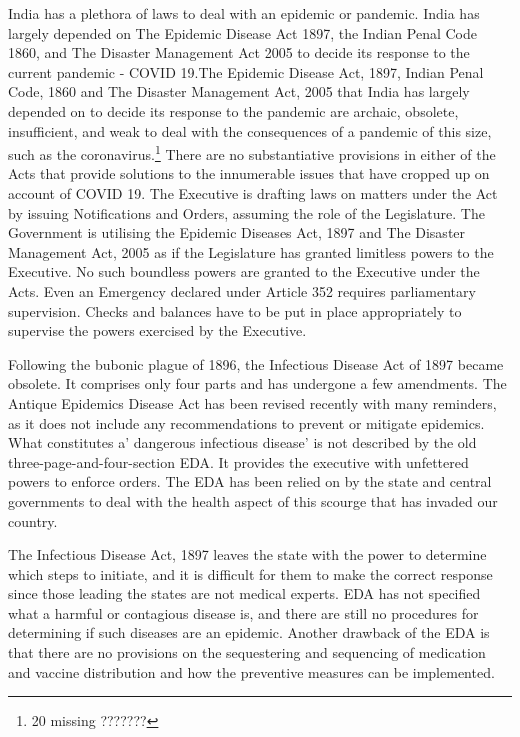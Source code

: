 \begin{multicols}{2}

\noi
India has a plethora of laws to deal with an epidemic or pandemic. India has largely depended
on The Epidemic Disease Act 1897, the Indian Penal Code 1860, and The Disaster
Management Act 2005 to decide its response to the current pandemic - COVID 19.The
Epidemic Disease Act, 1897, Indian Penal Code, 1860 and The Disaster Management Act,
2005 that India has largely depended on to decide its response to the pandemic are archaic,
obsolete, insufficient, and weak to deal with the consequences of a pandemic of this size, 
such as the coronavirus.\footnote{20 missing ???????} There are no substantiative provisions in either of the Acts that
provide solutions to the innumerable issues that have cropped up on account of COVID 19.
The Executive is drafting laws on matters under the Act by issuing Notifications and Orders,
assuming the role of the Legislature. The Government is utilising the Epidemic Diseases Act,
1897 and The Disaster Management Act, 2005 as if the Legislature has granted limitless
powers to the Executive. No such boundless powers are granted to the Executive under the
Acts. Even an Emergency declared under Article 352 requires parliamentary supervision.
Checks and balances have to be put in place appropriately to supervise the powers exercised
by the Executive.


\noi
Following the bubonic plague of 1896, the Infectious Disease Act of 1897 became obsolete.
It comprises only four parts and has undergone a few amendments. The Antique Epidemics
Disease Act has been revised recently with many reminders, as it does not include any
recommendations to prevent or mitigate epidemics. What constitutes a' dangerous infectious
disease' is not described by the old three-page-and-four-section EDA. It provides the
executive with unfettered powers to enforce orders. The EDA has been relied on by the state
and central governments to deal with the health aspect of this scourge that has invaded our
country.

\noi
The Infectious Disease Act, 1897 leaves the state with the power to determine which steps to
initiate, and it is difficult for them to make the correct response since those leading the states
are not medical experts. EDA has not specified what a harmful or contagious disease is, and
there are still no procedures for determining if such diseases are an epidemic. Another
drawback of the EDA is that there are no provisions on the sequestering and sequencing of
medication and vaccine distribution and how the preventive measures can be implemented.


\end{multicols}
